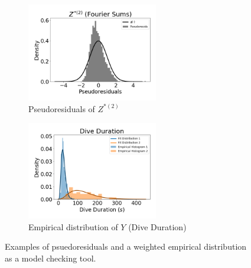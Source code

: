 \begin{figure}[ht]
    \begin{subfigure}{0.45\textwidth}
    	\centering
    	\includegraphics[width=2.25in]{../Plots/psedoresids_ahat.png}
    	\caption{Pseudoresiduals of $Z^{*(2)}$}
    	\label{fig:pseudoresids}
    \end{subfigure}
    \begin{subfigure}{0.45\textwidth}
    	\centering
    	\includegraphics[width=2.25in]{../Plots/empirical_hist_dive_duration.png}
    	\caption{Empirical distribution of $Y$ (Dive Duration)}
    	\label{fig:empirical_dist}
    \end{subfigure}
    \caption{Examples of psuedoresiduals and a weighted empirical distribution as a model checking tool.}
    \label{fig:model_checking}
\end{figure}